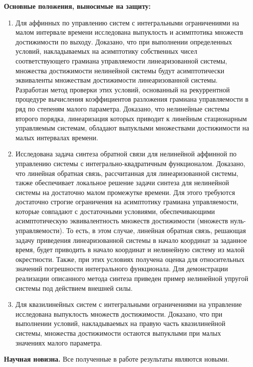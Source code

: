 \documentclass[../main.tex]{subfiles}
\begin{document}
\textbf{Основные положения, выносимые на защиту:} 
\begin{enumerate}
	\item Для аффинных по управлению систем с интегральными ограничениями на малом интервале времени исследована выпуклость и асимптотика множеств достижимости по выходу.
	Доказано, что при выполнении определенных условий, накладываемых на асимптотику собственных чисел соответствующего грамиана управляемости линеаризованной системы, множества достижимости нелинейной системы будут асимптотически эквиваленты множествам достижимости линеаризованной системы. 
	Разработан метод проверки этих условий, основанный на рекуррентной процедуре вычисления коэффициентов разложения грамиана управляемости в ряд по степеням малого параметра.
	Доказано, что нелинейные системы второго порядка, линеаризация которых приводит к линейным стационарным управляемым системам, обладают выпуклыми множествами достижимости на малых интервалах времени.
	
	\item Исследована задача синтеза обратной связи для нелинейной аффинной по управлению системы с интегрально-квадратичным функционалом. 
	Доказано, что линейная обратная связь, рассчитанная для линеаризованной системы, также обеспечивает локальное решение задачи синтеза для нелинейной системы на достаточно малом промежутке времени.  
	Для этого требуются достаточно строгие ограничения на асимптотику грамиана управляемости, которые совпадают с достаточными условиями, обеспечивающими асимптотическую эквивалентность множеств достижимости (множеств нуль-управляемости). 
	То есть, в этом случае, линейная обратная связь, решающая задачу приведения линеаризованной системы в начало координат за заданное время, будет приводить в начало координат и нелинейную систему из малой окрестности.
	Также, при этих условиях получена оценка для относительных значений погрешности интегрального функционала. 
	Для демонстрации реализации описанного метода синтеза приведен пример нелинейной упругой системы под действием внешней силы. 
	
	\item Для квазилинейных систем с интегральными ограничениями на управление исследована выпуклость множеств достижимости. 
	Доказано, что при выполнении условий, накладываемых на правую часть квазилинейной системы, множества достижимости остаются выпуклыми при малых значениях малого параметра. 
\end{enumerate}


\textbf{Научная новизна.} Все полученные в работе результаты являются новыми.
\end{document}
